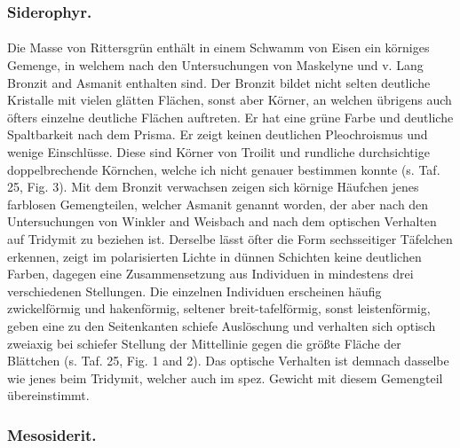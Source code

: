 \documentclass[a4paper, 11pt, oneside, polutonikogreek, german]{article}
\begin{document}
\subsubsection{Siderophyr.}
\paragraph{}
Die Masse von Rittersgrün enthält in einem Schwamm von Eisen ein körniges Gemenge, in welchem nach den Untersuchungen von Maskelyne und v. Lang Bronzit and Asmanit enthalten sind. Der Bronzit bildet nicht selten deutliche Kristalle mit vielen glätten Flächen, sonst aber Körner, an welchen übrigens auch öfters einzelne deutliche Flächen auftreten. Er hat eine grüne Farbe und deutliche Spaltbarkeit nach dem Prisma. Er zeigt keinen deutlichen Pleochroismus und wenige Einschlüsse. Diese sind Körner von Troilit und rundliche durchsichtige doppelbrechende Körnchen, welche ich nicht genauer bestimmen konnte (s. Taf. 25, Fig. 3). Mit dem Bronzit verwachsen zeigen sich körnige Häufchen jenes farblosen Gemengteilen, welcher Asmanit genannt worden, der aber nach den Untersuchungen von Winkler and Weisbach and nach dem optischen Verhalten auf Tridymit zu beziehen ist. Derselbe lässt öfter die Form sechsseitiger Täfelchen erkennen, zeigt im polarisierten Lichte in dünnen Schichten keine deutlichen Farben, dagegen eine Zusammensetzung aus Individuen in mindestens drei verschiedenen Stellungen. Die einzelnen Individuen erscheinen häufig zwickelförmig und hakenförmig, seltener breit-tafelförmig, sonst leistenförmig, geben eine zu den Seitenkanten schiefe Auslöschung und verhalten sich optisch zweiaxig bei schiefer Stellung der Mittellinie gegen die größte Fläche der Blättchen (s. Taf. 25, Fig. 1 and 2). Das optische Verhalten ist demnach dasselbe wie jenes beim Tridymit, welcher auch im spez. Gewicht mit diesem Gemengteil übereinstimmt.

\subsubsection{Mesosiderit.}
\end{document}
